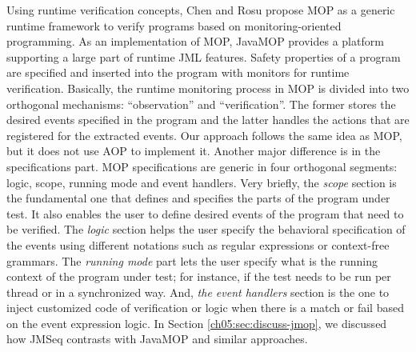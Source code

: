 Using runtime verification concepts, Chen and Rosu propose MOP
\cite{chen_rosu_mop,MOP} as a generic runtime framework to verify programs
based on monitoring-oriented programming. As an
implementation of MOP,
JavaMOP \cite{chen_rosu_jmop} provides a platform supporting a large part of
runtime JML features. Safety properties of a program are specified and 
inserted into the program with monitors for runtime verification. Basically,
the runtime monitoring process in MOP is divided into two orthogonal
mechanisms: ``observation'' and ``verification''. The former stores the desired
events specified in the program and the latter handles the actions that are
registered for the extracted events. Our approach follows the same idea as MOP,
but it does not use AOP to implement it. Another major
difference is in the specifications part. MOP specifications are  generic in
four orthogonal segments: logic, scope, running mode and event handlers.  Very
briefly, the \textit{scope} section is the fundamental one that defines and
specifies the parts of the program under test. It also enables the user to
define desired events of the program that need to be verified. The
\textit{logic} section helps the user specify the behavioral specification of
the events using different notations such as regular expressions or
context-free grammars. The \textit{running mode} part lets the user specify
what is the running context of the program under test; for instance, if the
test needs to be run per thread or in a synchronized way. And, \textit{the
event handlers} section is the one to inject customized code of verification or
logic when there is a match or fail based on the event expression logic.
In Section \ref{ch05:sec:discuss-jmop}, we discussed how JMSeq contrasts with JavaMOP and similar approaches.




   
